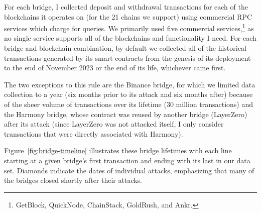 For each bridge, I collected deposit and withdrawal transactions for
each of the blockchains it operates on (for the 21 chains we
support) using commercial RPC services which charge for queries.  We
primarily used five commercial services,\footnote{%
GetBlock, QuickNode, ChainStack, GoldRush, and Ankr.} 
as no single service supports
all of the blockchains and functionality I need.
For each bridge and blockchain combination, by default we
collected all of the historical transactions generated by its smart
contracts from the genesis of its deployment to the end of November
2023 or the end of its life, whichever came first.

The two exceptions to this rule are the Binance bridge, for which we
limited data collection to a year (six months prior to its attack and
six months after) because of the sheer volume of transactions over its
lifetime (30 million transactions) and the Harmony bridge, whose
contract was reused by another bridge (LayerZero) after its attack
(since LayerZero was not attacked itself, I only consider transactions that were directly associated with Harmony).


%
%

Figure~\ref{fig:bridge-timeline} illustrates these bridge lifetimes
with each line starting at a given bridge's first transaction and
ending with its last in our data set.  Diamonds indicate the dates of
individual attacks, emphasizing that many of the bridges closed
shortly after their attacks.
